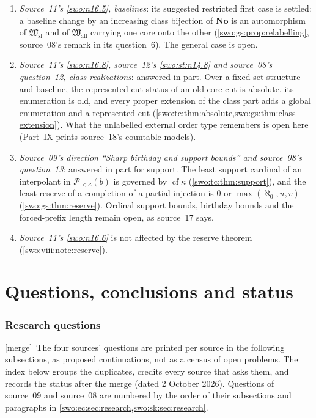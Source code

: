 \documentclass[11pt]{article}
\theoremstyle{definition}
\theoremstyle{remark}
\newcommand{\No}{\mathbf{No}}
\newcommand{\Hsl}{\mathfrak W_{\mathrm{sl}}}
\newcommand{\Hall}{\mathfrak W_{\mathrm{all}}}
\newcommand{\cf}{\operatorname{cf}}
\newcommand{\merge}{\textsf{[merge]}}
\begin{document}
\begin{enumerate}[label=(\alph*)]
stabilizer of the exhaustive cuts, and which extra predicates make the
reconstruction unique (source~14's and source~17's own questions).
\item \emph{Source~11's \cref{swo:n16.5}, baselines}: its suggested restricted
first case is settled: a baseline change by an increasing class bijection of
$\No$ is an automorphism of $\Hsl$ and of $\Hall$ carrying one core onto the
other (\cref{swo:gs:prop:relabelling}, source~08's remark in its question~6).
The general case is open.
\item \emph{Source~11's \cref{swo:n16.8}, source~12's \cref{swo:st:n14.8} and
source~08's question~12, class realizations}: answered in part. Over a fixed
set structure and baseline, the represented-cut status of an old core cut is
absolute, its enumeration is old, and every proper extension of the class
part adds a global enumeration and a represented cut
(\cref{swo:tc:thm:absolute,swo:gs:thm:class-extension}). What the unlabelled
external order type remembers is open here (Part~IX prints source~18's
countable models).
\item \emph{Source~09's direction ``Sharp birthday and support bounds'' and
source~08's question~13}: answered in part for support. The least support
cardinal of an interpolant in $\mathcal P_{<\kappa}(b)$ is governed by
$\cf\kappa$ (\cref{swo:tc:thm:support}), and the least reserve of a
completion of a partial injection is $0$ or $\max(\aleph_0,u,v)$
(\cref{swo:gs:thm:reserve}). Ordinal support bounds, birthday bounds and the
forced-prefix length remain open, as source~17 says.
\item \emph{Source~11's \cref{swo:n16.6}} is not affected by the reserve
theorem (\cref{swo:viii:note:reserve}).
\end{enumerate}

\cleardoublepage{}
{}
\part*{Questions, conclusions and status}
\section{Research questions}\label{swo:sec:questions}

\merge\ The four sources' questions are printed per source in the following
subsections, as proposed continuations, not as a census of open problems.
The index below groups the duplicates, credits every source that asks them,
and records the status after the merge (dated 2 October 2026). Questions of
source~09 and source~08 are numbered by the order of their subsections and
paragraphs in \cref{swo:ec:sec:research,swo:sk:sec:research}.
\end{document}
